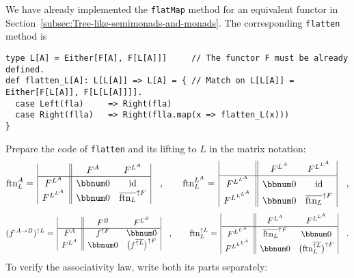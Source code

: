 We have already implemented the \lstinline!flatMap! method for an
equivalent functor in Section~\ref{subsec:Tree-like-semimonads-and-monads}.
The corresponding \lstinline!flatten! method is
\begin{lstlisting}
type L[A] = Either[F[A], F[L[A]]]     // The functor F must be already defined.
def flatten_L[A]: L[L[A]] => L[A] = { // Match on L[L[A]] = Either[F[L[A]], F[L[L[A]]]].
  case Left(fla)     => Right(fla)
  case Right(flla)   => Right(flla.map(x => flatten_L(x)))
}
\end{lstlisting}
Prepare the code of \lstinline!flatten! and its lifting to $L$ in
the matrix notation:
\[
\text{ftn}_{L}^{A}=\,\begin{array}{|c||cc|}
 & F^{A} & F^{L^{A}}\\
\hline F^{L^{A}} & \bbnum 0 & \text{id}\\
F^{L^{L^{A}}} & \bbnum 0 & \overline{\text{ftn}_{L}}^{\uparrow F}
\end{array}\quad,\quad\quad\text{ftn}_{L}^{L^{A}}=\,\begin{array}{|c||cc|}
 & F^{L^{A}} & F^{L^{L^{A}}}\\
\hline F^{L^{L^{A}}} & \bbnum 0 & \text{id}\\
F^{L^{L^{L^{A}}}} & \bbnum 0 & \overline{\text{ftn}_{L}}^{\uparrow F}
\end{array}\quad,
\]
\[
(f^{:A\rightarrow B})^{\uparrow L}=\,\begin{array}{|c||cc|}
 & F^{B} & F^{L^{B}}\\
\hline F^{A} & f^{\uparrow F} & \bbnum 0\\
F^{L^{A}} & \bbnum 0 & \big(f^{\overline{\uparrow L}}\big)^{\uparrow F}
\end{array}\quad,\quad\quad\text{ftn}_{L}^{\uparrow L}=\,\begin{array}{|c||cc|}
 & F^{L^{A}} & F^{L^{L^{A}}}\\
\hline F^{L^{L^{A}}} & \overline{\text{ftn}_{L}}^{\uparrow F} & \bbnum 0\\
F^{L^{L^{L^{A}}}} & \bbnum 0 & \big(\text{ftn}_{L}^{\overline{\uparrow L}}\big)^{\uparrow F}
\end{array}\quad.
\]
To verify the associativity law, write both its parts separately:
